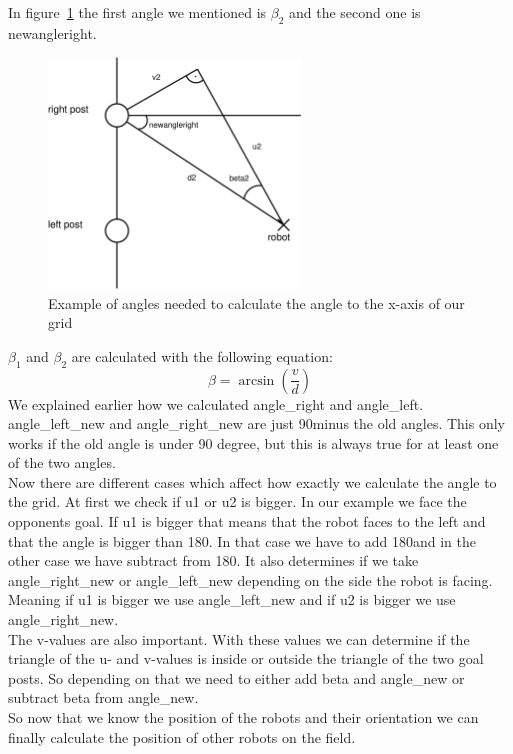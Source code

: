 \documentclass[lnicst,a4paper]{svmultln}
\begin{document}
In figure~\ref{fig:angles} the first angle we mentioned is \(\beta_{2}\) and the second one is newangleright.
\begin{figure}
 	\centerline{\includegraphics[width=0.6\textwidth]{angles.pdf}}
	{\caption{Example of angles needed to calculate the angle to the x-axis of our grid}\label{fig:angles}}
\end{figure}
\(\beta_{1}\) and \(\beta_{2}\) are calculated with the following equation:
\begin{equation}
	\beta = \arcsin{(\frac{v}{d})}
\end{equation}
We explained earlier how we calculated angle\_right and angle\_left. angle\_left\_new and angle\_right\_new are just 90\degree minus the old angles. 
This only works if the old angle is under 90 degree, but this is always true for at least one of the two angles.
\\
Now there are different cases which affect how exactly we calculate the angle to the grid. At first we check if u1 or u2 is bigger. In our example we face the opponents goal. If u1 is bigger that means that the robot faces to the left and that the angle is bigger than 180\degree. In that case we have to add 180\degree and in the other case we have subtract from 180\degree. It also determines if we take angle\_right\_new or angle\_left\_new depending on the side the robot is facing. Meaning if u1 is bigger we use angle\_left\_new and if u2 is bigger we use angle\_right\_new.
\\
The v-values are also important. With these values we can determine if the triangle of the u- and v-values is inside or outside the triangle of the two goal posts.
So depending on that we need to either add beta and angle\_new or subtract beta from angle\_new. 
\\
So now that we know the position of the robots and their orientation we can finally calculate the position of other robots on the field.
\end{document}
